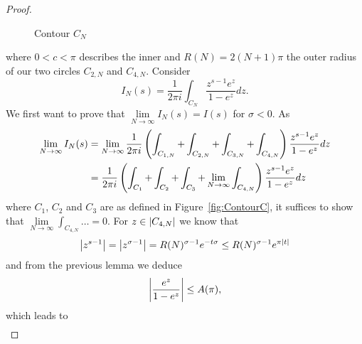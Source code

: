 \begin{proof}
\begin{figure}[!htb]
\begin{minipage}[c]{0.45\textwidth}
\end{minipage}
\caption{Contour $C_N$}
\label{fig:ContourCN}
\end{figure}
	where $0 < c < \pi$ describes the inner and $R(N) = 2(N + 1) \pi$ the outer radius of our two circles $C_{2,N}$ and $C_{4,N}$. Consider
\begin{equation*}
	I_N(s) = \frac{1}{2 \pi i} \int _{C_N} \frac{z^{s - 1} e^z}{1 - e^z} dz.
\end{equation*}
	We first want to prove that $\lim\limits_{N \to \infty} I_N(s) = I(s)$ for $\sigma < 0$. As
\begin{equation*}
\begin{aligned}
	\lim\limits_{N \to \infty} I_N(s)
		&= \lim\limits_{N \to \infty} \frac{1}{2 \pi i} \left(\int_{C_{1,N}} + \int_{C_{2,N}} + \int_{C_{3,N}} + \int_{C_{4,N}}\right) \frac{z^{s - 1} e^z}{1 - e^z} dz \\
		&= \frac{1}{2 \pi i} \left(\int_{C_{1}} + \int_{C_{2}} + \int_{C_{3}} + \lim\limits_{N \to \infty}\int_{C_{4,N}}\right) \frac{z^{s - 1} e^z}{1 - e^z} dz
\end{aligned}
\end{equation*}
	where $C_1$, $C_2$ and $C_3$ are as defined in Figure~\ref{fig:ContourC}, it suffices to show that $\lim\limits_{N \to \infty} \int _{C_{4,N}} \dots = 0$. For $z \in \left|C_{4,N}\right|$ we know that
\begin{equation*}
	\left|z^{s - 1}\right| = \left|z^{\sigma - 1}\right| = R(N)^{\sigma - 1} e^{-t \sigma} \leq R(N)^{\sigma -1} e^{\pi \left|t\right|}
\end{equation*}
	and from the previous lemma we deduce
\begin{equation*}
	\left|\frac{e^z}{1 - e^z}\right| \leq A(\pi),
\end{equation*}
	which leads to
\begin{equation*}
\begin{aligned}	

\end{aligned}
\end{equation*}
\end{proof}
